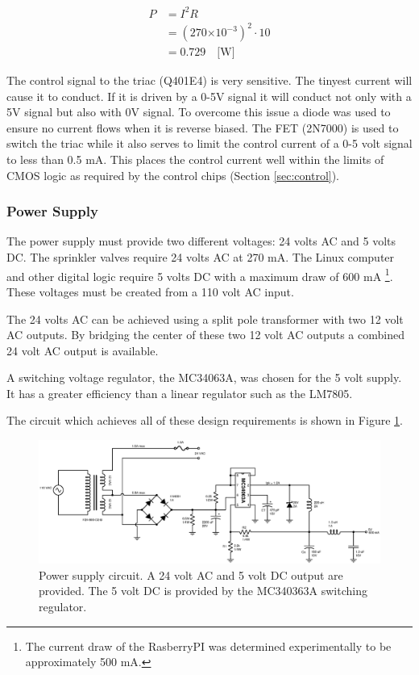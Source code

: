 \documentclass{article}
\providecommand{\e}[1]{\ensuremath{\times 10^{#1}}}
\begin{document}
\begin{align*}
	P &= I^2 R \\
	  &= (270\e{-3})^2 \cdot 10 \\
	  &= 0.729 \quad \text{[W]}
\end{align*}

The control signal to the triac (Q401E4) is very sensitive.
The tinyest current will cause it to conduct.
If it is driven by a 0-5V signal it will conduct not only
with a 5V signal but also with 0V signal.
To overcome this issue a diode was used to ensure no current
flows when it is reverse biased.
The FET (2N7000) is used to switch the triac while it also
serves to limit the control current of a 0-5 volt signal
to less than 0.5 mA.
This places the control current well within the limits
of CMOS logic as required by the control chips (Section \ref{sec:control}).


\subsubsection{Power Supply}
\label{sec:power}

The power supply must provide two different voltages: 24 volts AC and
5 volts DC.
The sprinkler valves require 24 volts AC at 270 mA.
The Linux computer and other digital logic require 5 volts DC with a
maximum draw of 600 mA
\footnote{The current draw of the RasberryPI was determined
experimentally to be approximately 500 mA.}.
These voltages must be created from a 110 volt AC input.

The 24 volts AC can be achieved using a split pole transformer
with two 12 volt AC outputs.
By bridging the center of these two 12 volt AC outputs
a combined 24 volt AC output is available.

A switching voltage regulator, the MC34063A, was chosen for
the 5 volt supply.
It has a greater efficiency than a linear regulator such as
the LM7805.

The circuit which achieves all of these design requirements is
shown in Figure \ref{fig:power}.

\begin{figure}[hbp]
\centering
\includegraphics[angle=90,scale=0.70]{xcircuit/power_supply}
\caption{Power supply circuit. A 24 volt AC and 5 volt DC output are
provided.  The 5 volt DC is provided by the MC340363A switching
regulator.}\label{fig:power}
\end{figure}
\end{document}
